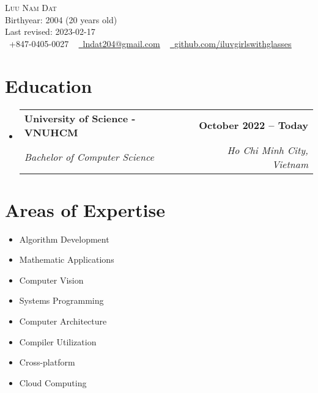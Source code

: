 \documentclass[letterpaper,11pt]{article}
\makeatletter
\newcommand{\resumeSubheading}[4]{
\vspace{-2pt}\item
\begin{tabular*}{1.0\textwidth}[t]{l@{\extracolsep{\fill}}r}
\textbf{#1} & \textbf{\small #2} \\
\textit{\small#3} & \textit{\small #4} \\
    \end{tabular*}\vspace{-7pt}
}
\newcommand{\resumeSubHeadingListStart}{\begin{itemize}[leftmargin=0.0in, label={}]}
\newcommand{\resumeSubHeadingListEnd}{\end{itemize}}
\makeatother
\begin{document}

\begin{center}
{\Huge \scshape Luu Nam Dat} \\ \vspace{1pt}
Birthyear: 2004 (20 years old) \\ \vspace{1pt}
Last revised: 2023-02-17 \\ \vspace{1pt}
\small \raisebox{-0.1\height}\faPhone\ +847-0405-0027 ~ \href{mailto:lndat204@gmail.com}{\raisebox{-0.2\height}\faEnvelope\  \underline{lndat204@gmail.com}} ~ 
\href{https://github.com/iluvgirlswithglasses}{\raisebox{-0.2\height}\faGithub\ \underline{github.com/iluvgirlswithglasses}}
\vspace{-8pt}
\end{center}


\section{Education}
\resumeSubHeadingListStart
\resumeSubheading
{University of Science - VNUHCM}{October 2022 -- Today}
{Bachelor of Computer Science}{Ho Chi Minh City, Vietnam}
\resumeSubHeadingListEnd


\section{Areas of Expertise}
\begin{multicols}{4}
\begin{itemize}[itemsep=-5pt, parsep=3pt]
\item\small Algorithm Development
\item Mathematic Applications
\item Computer Vision
\item Systems Programming
\item Computer Architecture
\item Compiler Utilization
\item Cross-platform
\item Cloud Computing
\end{itemize}
\end{multicols}
\vspace*{2.0\multicolsep}
\end{document}

